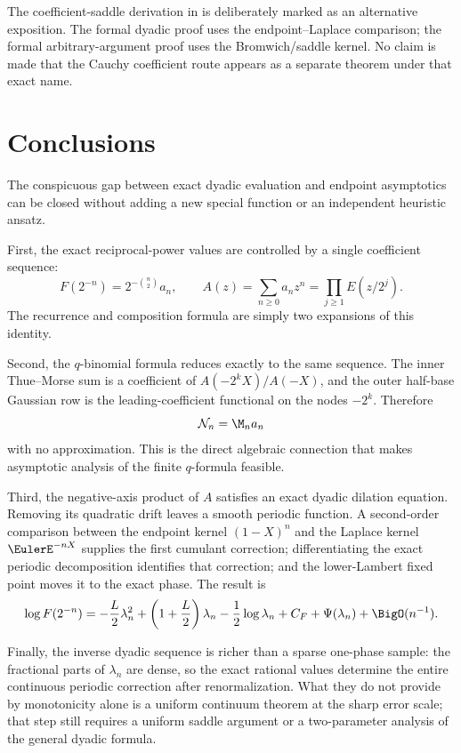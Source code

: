 \documentclass[11pt,oneside]{article}
\theoremstyle{definition}
\theoremstyle{remark}
\begin{document}
The coefficient-saddle derivation in  is deliberately marked as
an alternative exposition.  The formal dyadic proof uses the endpoint--Laplace comparison;
the formal arbitrary-argument proof uses the Bromwich/saddle kernel.  No claim is made that
the Cauchy coefficient route appears as a separate theorem under that exact name.

\section{Conclusions}
\label{dyadicasym:sec:conclusion}

The conspicuous gap between exact dyadic evaluation and endpoint asymptotics can be closed
without adding a new special function or an independent heuristic ansatz.

First, the exact reciprocal-power values are controlled by a single coefficient sequence:
\begin{equation*}
 F(2^{-n})=2^{-\binom n2}a_n,
 \qquad
 A(z)=\sum_{n\ge0}a_nz^n=\prod_{j\ge1}E(z/2^j).
\end{equation*}
The recurrence and composition formula are simply two expansions of this identity.

Second, the $q$-binomial formula reduces exactly to the same sequence.  The inner Thue--Morse
sum is a coefficient of $A(-2^kX)/A(-X)$, and the outer half-base Gaussian row is the
leading-coefficient functional on the nodes $-2^k$.  Therefore
\begin{equation*}
 \mathcal N_n=\M_na_n
\end{equation*}
with no approximation.  This is the direct algebraic connection that makes asymptotic
analysis of the finite $q$-formula feasible.

Third, the negative-axis product of $A$ satisfies an exact dyadic dilation equation.  Removing
its quadratic drift leaves a smooth periodic function.  A second-order comparison between the
endpoint kernel $(1-X)^n$ and the Laplace kernel $\EulerE^{-nX}$ supplies the first cumulant
correction; differentiating the exact periodic decomposition identifies that correction; and
the lower-Lambert fixed point moves it to the exact phase.  The result is
\begin{equation*}
 \log F(2^{-n})=
 -\frac L2\lambda_n^2+
 \left(1+\frac L2\right)\lambda_n-\frac12\log\lambda_n
 +C_F+\Psi(\lambda_n)+\BigO(n^{-1}).
\end{equation*}

Finally, the inverse dyadic sequence is richer than a sparse one-phase sample: the fractional
parts of $\lambda_n$ are dense, so the exact rational values determine the entire continuous
periodic correction after renormalization.  What they do not provide by monotonicity alone is
a uniform continuum theorem at the sharp error scale; that step still requires a uniform
saddle argument or a two-parameter analysis of the general dyadic formula.
\end{document}
